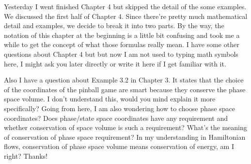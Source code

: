 \begin{description}
   Yesterday I went finished Chapter 4 but skipped the detail of the some examples. We discussed the first half of Chapter 4. Since there're pretty much mathematical detail and examples, we decide to break it into two parts. By the way, the notation of this chapter at the beginning is a little bit confusing and took me a while to get the concept of what those formulas really mean. I have some other questions about Chapter 4 but but now I am not used to typing math symbols here, I might ask you later directly or write it here if I get familiar with it.
   
   Also I have a question about Example 3.2 in Chapter 3. It states that the choice of the coordinates of the pinball game are smart because they conserve the phase space volume. I don't understand this, would you mind explain it more specifically? Going from here, I am also wondering how to choose phase space coordinates? Does phase/state space coordinates have any requirement and whether conservation of space volume is such a requirement? What's the meaning of conservation of phase space requirement? In my understanding in Hamiltonian flows, conservation of phase space volume means conservation of energy, am I right? Thanks!

   
   
\end{description}
